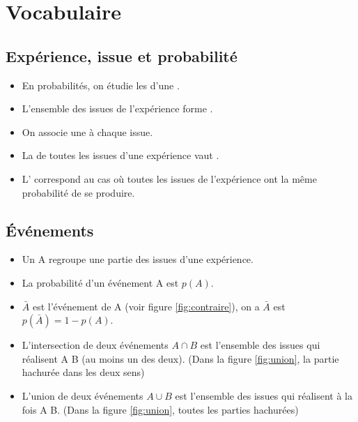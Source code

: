 \documentclass[12pt,a4paper]{article}
\date{}
\title{}
\begin{document}
	
	\section{Vocabulaire}
	
	\subsection{Expérience, issue et probabilité}
	\begin{mydefs}
		\begin{itemize}
			\item En probabilités, on étudie les  d'une .
			\item L'ensemble des issues de l'expérience forme .
			\item On associe une  à chaque issue.
			\item La  de toutes les issues d'une expérience vaut .
			\item L' correspond au cas où toutes les issues de l'expérience ont la même probabilité de se produire.
		\end{itemize}
		
		
	\end{mydefs}
	
	
	
	\subsection{\'Evénements}
	
	\begin{mydefs}
		\begin{itemize}
			\item Un  A regroupe une partie des issues d'une expérience.
			\item La probabilité d'un événement A est $p(A)$.
			\item $\bar{A}$ est l'événement  de A (voir figure \ref{fig:contraire}), on a $\bar{A}$ est $p(\bar{A}) = 1 - p(A)$.
			\item L'intersection de deux événements $A \cap B$ est l'ensemble des issues qui réalisent A  B (au moins un des deux). (Dans la figure \ref{fig:union}, la partie hachurée dans les deux sens)
			\item L'union de deux événements $A \cup B$ est l'ensemble des issues qui réalisent à la fois A  B. (Dans la figure \ref{fig:union}, toutes les parties hachurées)
			
		\end{itemize}
	\end{mydefs}
	
\end{document}
